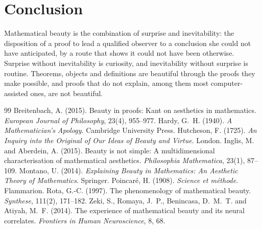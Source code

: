 \documentclass{situationist-preprint}
\begin{document}
\section{Conclusion}

Mathematical beauty is the combination of surprise and inevitability: the disposition of a proof to lead a qualified observer to a conclusion she could not have anticipated, by a route that shows it could not have been otherwise. Surprise without inevitability is curiosity, and inevitability without surprise is routine. Theorems, objects and definitions are beautiful through the proofs they make possible, and proofs that do not explain, among them most computer-assisted ones, are not beautiful.

\begin{thebibliography}{99}\small
{} Breitenbach, A. (2015). Beauty in proofs: Kant on aesthetics in mathematics. \emph{European Journal of Philosophy}, 23(4), 955--977.
 Hardy, G.~H. (1940). \emph{A Mathematician's Apology}. Cambridge University Press.
 Hutcheson, F. (1725). \emph{An Inquiry into the Original of Our Ideas of Beauty and Virtue}. London.
 Inglis, M. and Aberdein, A. (2015). Beauty is not simple: A multidimensional characterisation of mathematical aesthetics. \emph{Philosophia Mathematica}, 23(1), 87--109.
 Montano, U. (2014). \emph{Explaining Beauty in Mathematics: An Aesthetic Theory of Mathematics}. Springer.
 Poincar\'e, H. (1908). \emph{Science et m\'ethode}. Flammarion.
 Rota, G.-C. (1997). The phenomenology of mathematical beauty. \emph{Synthese}, 111(2), 171--182.
 Zeki, S., Romaya, J.~P., Benincasa, D.~M.~T. and Atiyah, M.~F. (2014). The experience of mathematical beauty and its neural correlates. \emph{Frontiers in Human Neuroscience}, 8, 68.
\end{thebibliography}
\end{document}
